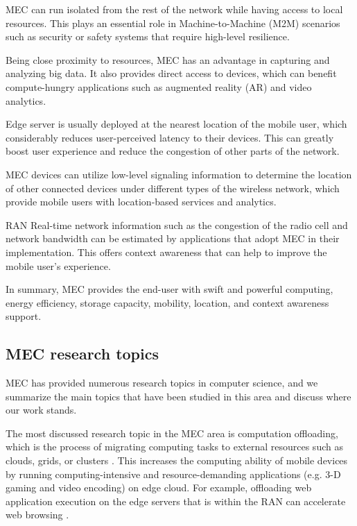  MEC can run isolated from the rest of the network while having access to local resources. This plays an essential role in Machine-to-Machine (M2M) scenarios such as security or safety systems that require high-level resilience.

 Being close proximity to resources, MEC has an advantage in capturing and analyzing big data. It also provides direct access to devices, which can benefit compute-hungry applications such as augmented reality (AR) and video analytics.

 Edge server is usually deployed at the nearest location of the mobile user, which considerably reduces user-perceived latency to their devices. This can greatly boost user experience and reduce the congestion of other parts of the network.

  MEC devices can utilize low-level signaling information to determine the location of other connected devices under different types of the wireless network, which provide mobile users with location-based services and analytics.

 RAN Real-time network information such as the congestion of the radio cell and network bandwidth can be estimated by applications that adopt MEC in their implementation. This offers context awareness that can help to improve the mobile user's experience.

In summary, MEC provides the end-user with swift and powerful computing, energy efficiency, storage capacity, mobility, location, and context awareness support. 
%

\subsection{MEC research topics}
MEC has provided numerous research topics in computer science, and we summarize the main topics that have been studied in this area and discuss where our work stands.

The most discussed research topic in the MEC area is computation offloading, which is the process of migrating computing tasks to external resources such as clouds, grids, or clusters \cite{ma2013mobile}.
This increases the computing ability of mobile devices by running computing-intensive and resource-demanding applications (e.g. 3-D gaming and video encoding) on edge cloud. 
For example, offloading web application execution on the edge servers that is within the RAN can accelerate web browsing \cite{takahashi2015analysis}.

